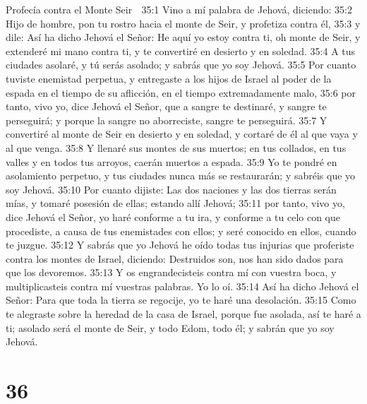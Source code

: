 Profecía contra el Monte Seir  

35:1 Vino a mí palabra de Jehová, diciendo:  
35:2 Hijo de hombre, pon tu rostro hacia el monte de Seir,  y profetiza contra él,  
35:3 y dile: Así ha dicho Jehová el Señor: He aquí yo estoy contra ti, oh monte de Seir, y extenderé mi mano contra ti, y te convertiré en desierto y en soledad.  
35:4 A tus ciudades asolaré, y tú serás asolado; y sabrás que yo soy Jehová.  
35:5 Por cuanto tuviste enemistad perpetua, y entregaste a los hijos de Israel al poder de la espada en el tiempo de su aflicción, en el tiempo extremadamente malo,  
35:6 por tanto, vivo yo, dice Jehová el Señor, que a sangre te destinaré, y sangre te perseguirá; y porque la sangre no aborreciste, sangre te perseguirá.  
35:7 Y convertiré al monte de Seir en desierto y en soledad, y cortaré de él al que vaya y al que venga.  
35:8 Y llenaré sus montes de sus muertos; en tus collados, en tus valles y en todos tus arroyos, caerán muertos a espada.  
35:9 Yo te pondré en asolamiento perpetuo, y tus ciudades nunca más se restaurarán; y sabréis que yo soy Jehová.  
35:10 Por cuanto dijiste: Las dos naciones y las dos tierras serán mías, y tomaré posesión de ellas; estando allí Jehová;  
35:11 por tanto, vivo yo, dice Jehová el Señor, yo haré conforme a tu ira, y conforme a tu celo con que procediste, a causa de tus enemistades con ellos; y seré conocido en ellos, cuando te juzgue.  
35:12 Y sabrás que yo Jehová he oído todas tus injurias que proferiste contra los montes de Israel, diciendo: Destruidos son, nos han sido dados para que los devoremos.  
35:13 Y os engrandecisteis contra mí con vuestra boca, y multiplicasteis contra mí vuestras palabras. Yo lo oí.  
35:14 Así ha dicho Jehová el Señor: Para que toda la tierra se regocije, yo te haré una desolación.  
35:15 Como te alegraste sobre la heredad de la casa de Israel, porque fue asolada, así te haré a ti; asolado será el monte de Seir, y todo Edom, todo él; y sabrán que yo soy Jehová. 

\chapter{36}

